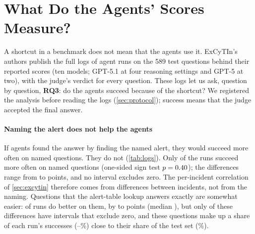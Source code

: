 \section{What Do the Agents' Scores Measure?}
\label{sec:scores}

A shortcut in a benchmark does not mean that the agents use it. ExCyTIn's authors publish the full logs of \lgModels{} agent runs on the 589 test questions behind their reported scores (ten models; GPT-5.1 at four reasoning settings and GPT-5 at two), with the judge's verdict for every question. These logs let us ask, question by question, \textbf{RQ3}: do the agents succeed because of the shortcut? We registered the analysis before reading the logs (\cref{sec:protocol}); success means that the judge accepted the final answer.

\begin{table}[t]
  \caption{Agents do not succeed more often when the question names the answer's alert. Success (\%) of each published run on the 589 ExCyTIn test questions: all questions; questions that name the end alert (337) and the others (252), with the difference and its 95\% interval (incidents resampled); questions the alert-table lookup answers exactly (``Lookup'', 140); and the shortcut-resistant questions (``Resist.'', \lgResN: not named, and neither lookup answers them), with the run's rank on them. Runs are sorted by overall success.}
  \label{tab:logs}
  \centering\footnotesize
  
\end{table}

\paragraph{Naming the alert does not help the agents} If agents found the answer by finding the named alert, they would succeed more often on named questions. They do not (\cref{tab:logs}). Only \lgPos{} of the \lgModels{} runs succeed more often on named questions (one-sided sign test $p=0.40$); the differences range from \lgDmin{} to \lgDmax{} points, and no interval excludes zero. The per-incident correlation of \cref{sec:excytin} therefore comes from differences between incidents, not from the naming. Questions that the alert-table lookup answers exactly are somewhat easier: \lgTPos{} of \lgModels{} runs do better on them, by \lgTmin{} to \lgTmax{} points (median \lgTmedian), but only \lgTCI{} of these differences have intervals that exclude zero, and these questions make up a share of each run's successes (\lgShareMin--\lgShareMax\%) close to their share of the test set (\oTable\%).

